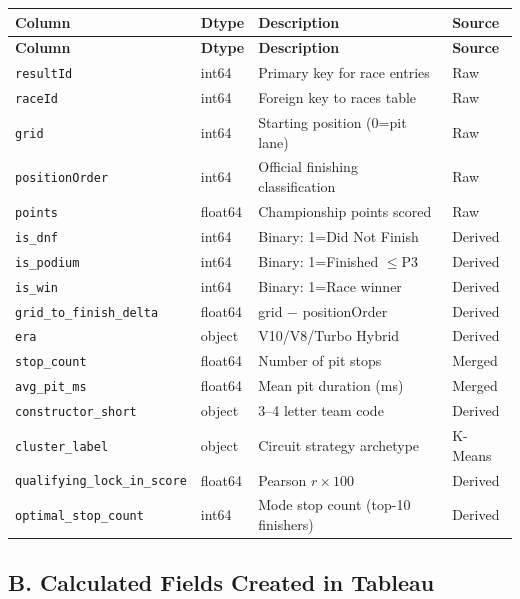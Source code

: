 \documentclass[12pt, a4paper]{article}
\begin{document}
\begin{longtable}{l l l l}
\toprule
\textbf{Column} & \textbf{Dtype} & \textbf{Description} & \textbf{Source} \\
\midrule
\endfirsthead
\toprule
\textbf{Column} & \textbf{Dtype} & \textbf{Description} & \textbf{Source} \\
\midrule
\endhead
\texttt{resultId}             & int64   & Primary key for race entries         & Raw   \\
\texttt{raceId}               & int64   & Foreign key to races table           & Raw   \\
\texttt{grid}                 & int64   & Starting position (0=pit lane)       & Raw   \\
\texttt{positionOrder}        & int64   & Official finishing classification     & Raw   \\
\texttt{points}               & float64 & Championship points scored           & Raw   \\
\texttt{is\_dnf}              & int64   & Binary: 1=Did Not Finish            & Derived \\
\texttt{is\_podium}           & int64   & Binary: 1=Finished $\leq$P3         & Derived \\
\texttt{is\_win}              & int64   & Binary: 1=Race winner               & Derived \\
\texttt{grid\_to\_finish\_delta} & float64 & grid $-$ positionOrder             & Derived \\
\texttt{era}                  & object  & V10/V8/Turbo Hybrid                 & Derived \\
\texttt{stop\_count}          & float64 & Number of pit stops                  & Merged  \\
\texttt{avg\_pit\_ms}         & float64 & Mean pit duration (ms)               & Merged  \\
\texttt{constructor\_short}   & object  & 3--4 letter team code                & Derived \\
\texttt{cluster\_label}       & object  & Circuit strategy archetype           & K-Means \\
\texttt{qualifying\_lock\_in\_score} & float64 & Pearson $r \times 100$        & Derived \\
\texttt{optimal\_stop\_count} & int64   & Mode stop count (top-10 finishers)   & Derived \\
\bottomrule
\end{longtable}

\subsection*{B. Calculated Fields Created in Tableau}
\end{document}
